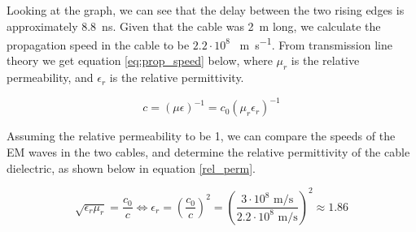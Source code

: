 Looking at the graph, we can see that the delay between the two rising edges is approximately \SI{8.8}{\nano\second}. Given that the cable was \SI{2}{\meter} long, we calculate the propagation speed in the cable to be $2.2 \cdot{10^8}$ \SI{}{\meter\per\second}. From transmission line theory \cite{textbook} we get equation \ref{eq:prop_speed} below, where $\mu_r$ is the relative permeability, and $\epsilon_r$ is the relative permittivity.

\begin{equation}
c = (\mu\epsilon)^{-1} = c_0(\mu_r\epsilon_r)^{-1}
\label{eq:prop_speed}
\end{equation}

Assuming the relative permeability to be 1, we can compare the speeds of the EM waves in the two cables, and determine the relative permittivity of the cable dielectric, as shown below in equation \ref{rel_perm}.

\begin{equation}
\sqrt{\epsilon_r\mu_r} = \frac{c_0}{c} \Leftrightarrow
\epsilon_r = \left(\frac{c_0}{c}\right)^2 = \left(\frac{3 \cdot 10^8 \text{ m/s}}{2.2 \cdot 10^8 \text{ m/s}}\right)^2 \approx 1.86
\label{rel_perm}
\end{equation}

